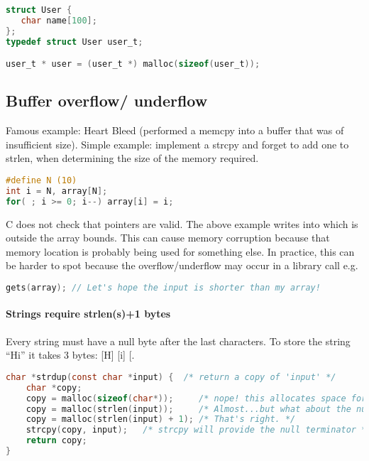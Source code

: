 \begin{lstlisting}[language=C]
struct User {
   char name[100];
};
typedef struct User user_t;

user_t * user = (user_t *) malloc(sizeof(user_t));
\end{lstlisting}

\subsection{Buffer overflow/ underflow}\label{buffer-overflow-underflow}

Famous example: Heart Bleed (performed a memcpy into a buffer that was of insufficient size). Simple example: implement a strcpy and forget to add one to strlen, when determining the size of the memory required.

\begin{lstlisting}[language=C]
#define N (10)
int i = N, array[N];
for( ; i >= 0; i--) array[i] = i;
\end{lstlisting}

C does not check that pointers are valid. The above example writes into
 which is outside the array bounds. This can cause
memory corruption because that memory location is probably being used
for something else. In practice, this can be harder to spot because the
overflow/underflow may occur in a library call e.g.

\begin{lstlisting}[language=C]
gets(array); // Let's hope the input is shorter than my array!
\end{lstlisting}


\paragraph{Strings require strlen(s)+1 bytes}

Every string must have a null byte after the last characters. To store
the string ``Hi'' it takes 3 bytes: {[}H{]} {[}i{]} {[}\0{]}.

\begin{lstlisting}[language=C]
  char *strdup(const char *input) {  /* return a copy of 'input' */
    char *copy;
    copy = malloc(sizeof(char*));     /* nope! this allocates space for a pointer, not a string */
    copy = malloc(strlen(input));     /* Almost...but what about the null terminator? */
    copy = malloc(strlen(input) + 1); /* That's right. */
    strcpy(copy, input);   /* strcpy will provide the null terminator */
    return copy;
}
\end{lstlisting}

